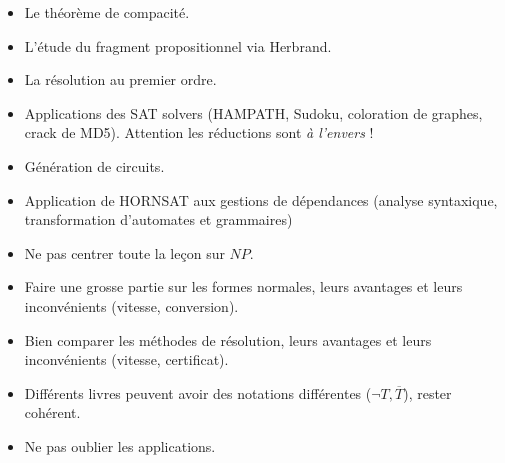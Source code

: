 \documentclass{agregfiche}
\begin{document}
\begin{itemize}
    \item Le théorème de compacité.
    \item L'étude du fragment propositionnel
        via Herbrand.
    \item La résolution au premier ordre.
    \item Applications des SAT solvers
        (HAMPATH, Sudoku, coloration de graphes, crack de MD5).
        Attention les réductions sont \emph{à l'envers} !
    \item Génération de circuits.
    \item Application de HORNSAT aux gestions de dépendances (analyse
        syntaxique, transformation d'automates et grammaires)
\end{itemize}

\secpieges

\begin{itemize}
    \item Ne pas centrer toute la leçon sur $NP$.
    \item Faire une grosse partie sur les formes normales, leurs avantages
        et leurs inconvénients (vitesse, conversion).
    \item Bien comparer les méthodes de résolution, leurs avantages et leurs
        inconvénients (vitesse, certificat).
      \item Différents livres peuvent avoir des notations
        différentes ($\neg T, \overline{T}$), rester cohérent.
      \item Ne pas oublier les applications.
\end{itemize}


\secquestionsclassiques
\end{document}
